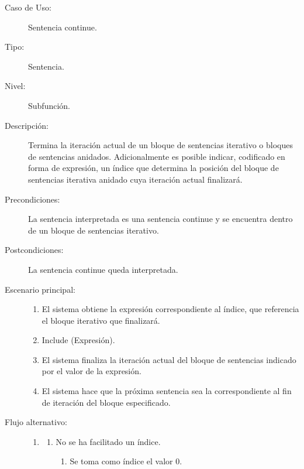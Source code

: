\begin{framed}
\FloatBarrier
\begin{description}
   \item[Caso de Uso:]  Sentencia continue.
   \item [Tipo:] Sentencia.
   \item[Nivel:]  Subfunción.
   \item[Descripción:] 
   Termina la iteración actual  de un bloque de sentencias iterativo o bloques de sentencias anidados. Adicionalmente
   es posible indicar, codificado en forma de expresión, un índice que determina la posición del bloque de sentencias iterativa anidado cuya 
   iteración actual finalizará.
   \item[Precondiciones:] 
   La sentencia interpretada es una sentencia continue y se encuentra dentro de un bloque de sentencias iterativo.
   \item[Postcondiciones:] 
   La sentencia continue queda interpretada.
   \item[Escenario principal:] \hfill
   \begin{enumerate}
   \item El sistema obtiene la expresión correspondiente al índice, que referencia el bloque iterativo que finalizará.
   \item Include (Expresión).
   \item El sistema finaliza la iteración actual del bloque de sentencias indicado por el valor de la expresión. 
   \item El sistema hace que la próxima sentencia sea la correspondiente al fin de iteración del bloque especificado.
   \end{enumerate}
   \item[Flujo alternativo:] \hfill 
   \begin{enumerate} \itemsep1pt \parskip0pt 
   \setcounter{enumi}{0}
   \renewcommand{\labelenumi}{}
   \renewcommand{\labelenumiii}{\arabic{enumiii}.}
   \renewcommand{\labelenumii}{\arabic{enumi}\alph{enumii}.}
      \item 
      \begin {enumerate}
         \setcounter{enumii}{0}
         \item No se ha facilitado un índice.
         \begin{enumerate}
         \item Se toma como índice el valor 0. 
         \end{enumerate}
      \end{enumerate}

\end{enumerate}
\end{description}
\end{framed}
